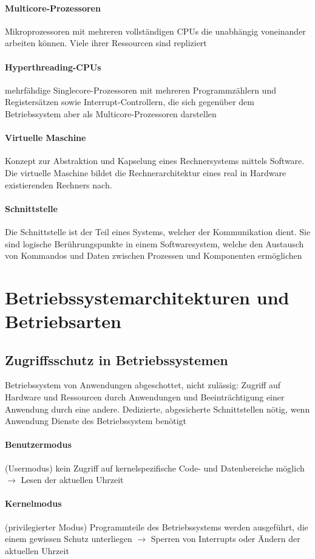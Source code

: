 \documentclass[11pt,a4paper,landscape]{article}
\begin{document}
\begin{multicols*}{3}
	\paragraph{Multicore-Prozessoren} Mikroprozessoren mit mehreren vollständigen CPUs die unabhängig voneinander arbeiten können. Viele ihrer Ressourcen sind repliziert
	\paragraph{Hyperthreading-CPUs} mehrfähdige Singlecore-Prozessoren mit mehreren Programmzählern und Registersätzen sowie Interrupt-Controllern, die sich gegenüber dem Betriebssystem aber als Multicore-Prozessoren darstellen
	\paragraph{Virtuelle Maschine} Konzept zur Abstraktion und Kapselung eines Rechnersystems mittels Software. Die virtuelle Maschine bildet die Rechnerarchitektur eines real in Hardware existierenden Rechners nach.
	\paragraph{Schnittstelle} Die Schnittstelle ist der Teil eines Systems, welcher der Kommunikation dient. Sie sind logische Berührungspunkte in einem Softwaresystem, welche den Austausch von Kommandos und Daten zwischen Prozessen und Komponenten ermöglichen
	\section{Betriebssystemarchitekturen und Betriebsarten}
	\subsection{Zugriffsschutz in Betriebssystemen}
	Betriebssystem von Anwendungen abgeschottet, nicht zulässig: Zugriff auf Hardware und Ressourcen durch Anwendungen und Beeinträchtigung einer Anwendung durch eine andere. Dedizierte, abgesicherte Schnittstellen nötig, wenn Anwendung Dienste des Betriebssystem benötigt
	\paragraph{Benutzermodus} (Usermodus) kein Zugriff auf kernelspezifische Code- und Datenbereiche möglich $\rightarrow$ Lesen der aktuellen Uhrzeit
	\paragraph{Kernelmodus} (privilegierter Modus) Programmteile des Betriebssystems werden ausgeführt, die einem gewissen Schutz unterliegen $\rightarrow$ Sperren von Interrupts oder Ändern der aktuellen Uhrzeit

\end{multicols*}
\end{document}
